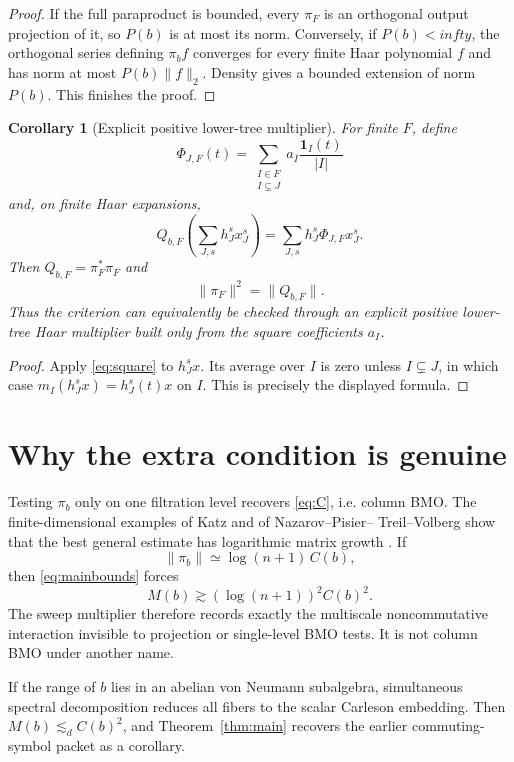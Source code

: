 \documentclass[11pt]{article}
\newtheorem{corollary}[theorem]{Corollary}
\newcommand{\one}{\mathbf 1}
\begin{document}
\begin{proof}
If the full paraproduct is bounded, every $\pi_F$ is an orthogonal output
projection of it, so $P(b)$ is at most its norm.  Conversely, if $P(b)<infty$,
the orthogonal series defining $\pi_b f$ converges for every finite Haar
polynomial $f$ and has norm at most $P(b)\|f\|_2$.  Density gives a bounded
extension of norm $P(b)$.  This finishes the proof.
\end{proof}

\begin{corollary}[Explicit positive lower-tree multiplier]\label{cor:positive}
For finite $F$, define
\[
 \Phi_{J,F}(t)=\sum_{\substack{I\in F\\I\subsetneq J}}
    a_I\frac{\one_I(t)}{|I|}
\]
and, on finite Haar expansions,
\[
 Q_{b,F}\!\left(\sum_{J,s}h_J^sx_J^s\right)
 =\sum_{J,s}h_J^s\Phi_{J,F}x_J^s.
\]
Then $Q_{b,F}=\pi_F^*\pi_F$ and
\[
 \|\pi_F\|^2=\|Q_{b,F}\|.
\]
Thus the criterion can equivalently be checked through an explicit positive
lower-tree Haar multiplier built only from the square coefficients $a_I$.
\end{corollary}

\begin{proof}
Apply \eqref{eq:square} to $h_J^sx$.  Its average over $I$ is zero unless
$I\subsetneq J$, in which case $m_I(h_J^sx)=h_J^s(t)x$ on $I$.
This is precisely the displayed formula.
\end{proof}

\section{Why the extra condition is genuine}

Testing $\pi_b$ only on one filtration level recovers \eqref{eq:C}, i.e.
column BMO.  The finite-dimensional examples of Katz and of Nazarov--Pisier--
Treil--Volberg show that the best general estimate has logarithmic matrix
growth \cite{NPTV}.  If
\[
 \|\pi_b\|\simeq\log(n+1)\,C(b),
\]
then \eqref{eq:mainbounds} forces
\[
 M(b)\gtrsim (\log(n+1))^2C(b)^2.
\]
The sweep multiplier therefore records exactly the multiscale
noncommutative interaction invisible to projection or single-level BMO
tests.  It is not column BMO under another name.

If the range of $b$ lies in an abelian von Neumann subalgebra, simultaneous
spectral decomposition reduces all fibers to the scalar Carleson embedding.
Then $M(b)\lesssim_d C(b)^2$, and Theorem~\ref{thm:main} recovers the earlier
commuting-symbol packet as a corollary.
\end{document}

